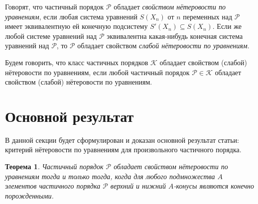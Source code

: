 \documentclass[12pt]{article}
\theoremstyle{break}
\newtheorem{Th}{Теорема}
\def\P{\mathcal{P}}
\begin{document}
		Говорят, что частичный порядок $\P$ обладает \textit{свойством нётеровости по уравнениям}, если любая система уравнений $S(X_n)$ от $n$ переменных над $\P$ имеет эквивалентную ей конечную подсистему $S'(X_n) \subseteq S(X_n)$. Если же любой системе уравнений над $\P$ эквивалентна какая-нибудь конечная система уравнений над $\P$, то $\P$ обладает свойством \textit{слабой нётеровости по уравнениям}.
		
		Будем говорить, что класс частичных порядков $\mathcal{K}$ обладает свойством (слабой) нётеровости по уравнениям, если любой частичный порядок $\P \in \mathcal{K}$ обладает свойством (слабой) нётеровости по уравнениям.
		
	
	\section{Основной результат}
		В данной секции будет сформулирован и доказан основной результат статьи: критерий нётеровости по уравнениям для произвольного частичного порядка.

		\begin{Th}\label{criterion}
			Частичный порядок $\P$ обладает свойством нётеровости по уравнениям тогда и только тогда, когда для любого подмножества $A$ элементов частичного порядка $\P$ верхний и нижний $A$-конусы являются конечно порожденными.
		\end{Th}
\end{document}
